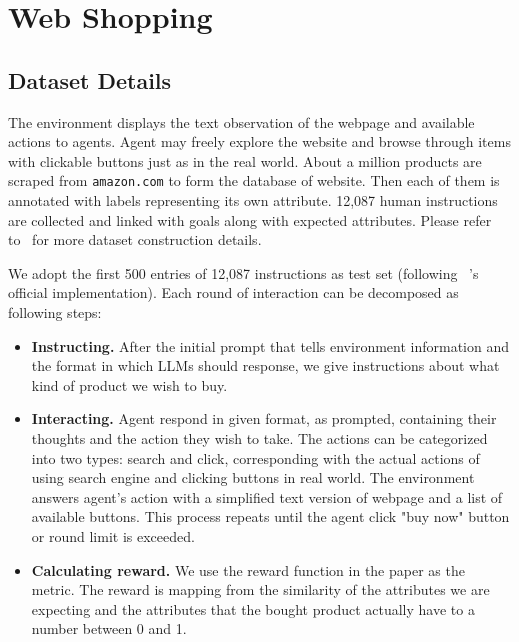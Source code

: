 \section{Web Shopping} \label{app:ws}
\subsection{Dataset Details}
The environment displays the text observation of the webpage and available actions to agents. 
Agent may freely explore the website and browse through items with clickable buttons just as in the real world. 
About a million products are scraped from \texttt{amazon.com} to form the database of website. 
Then each of them is annotated with labels representing its own attribute. 
12,087 human instructions are collected and linked with goals along with expected attributes.
Please refer to~\citep{yao2022webshop} for more dataset construction details.

We adopt the first 500 entries of 12,087 instructions as test set (following ~\citep{yao2022webshop}'s official implementation). Each round of interaction can be decomposed as following steps:
\begin{itemize}[leftmargin=1.5em,itemsep=0pt,parsep=0.2em,topsep=0.0em,partopsep=0.0em]
    \item \textbf{Instructing.} After the initial prompt that tells environment information and the format in which LLMs should response, we give instructions about what kind of product we wish to buy.
    \item \textbf{Interacting.} Agent respond in given format, as prompted, containing their thoughts and the action they wish to take. The actions can be categorized into two types: search and click, corresponding with the actual actions of using search engine and clicking buttons in real world. The environment answers agent's action with a simplified text version of webpage and a list of available buttons. This process repeats until the agent click "buy now" button or round limit is exceeded.  
    \item \textbf{Calculating reward.} We use the reward function in the paper as the metric. The reward is mapping from the similarity of the attributes we are expecting and the attributes that the bought product actually have to a number between 0 and 1.
\end{itemize}

